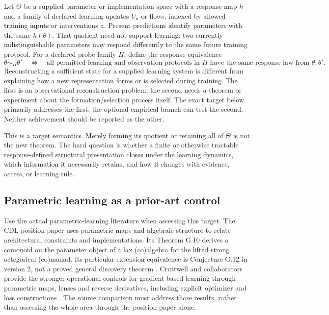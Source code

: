 \documentclass[11pt]{article}
\theoremstyle{remark}
\begin{document}
Let $\Theta$ be a supplied parameter or implementation space with a response map $h$ and a family of declared learning updates $U_a$ or flows, indexed by allowed training inputs or interventions $a$. Present predictions identify parameters with the same $h(\theta)$. That quotient need not support learning: two currently indistinguishable parameters may respond differently to the same future training protocol. For a declared probe family $\Pi$, define the response equivalence
\[
 \theta\sim_\Pi\theta'
 \quad\Longleftrightarrow\quad
 \text{all permitted learning-and-observation protocols in }\Pi
 \text{ have the same response law from }\theta,\theta'.
\]
Reconstructing a sufficient state for a supplied learning system is different from explaining how a new representation forms or is selected during training. The first is an observational reconstruction problem; the second needs a theorem or experiment about the formation/selection process itself. The exact target below primarily addresses the first; the optional empirical branch can test the second. Neither achievement should be reported as the other.

This is a target semantics. Merely forming its quotient or retaining all of $\Theta$ is not the new theorem. The hard question is whether a finite or otherwise tractable response-defined structural presentation closes under the learning dynamics, which information it necessarily retains, and how it changes with evidence, access, or learning rule.

\subsection{Parametric learning as a prior-art control}
\label{sec:parametric-control}

Use the actual parametric-learning literature when assessing this target. The CDL position paper uses parametric maps and algebraic structure to relate architectural constraints and implementations. Its Theorem G.10 derives a comonoid on the parameter object of a lax (co)algebra for the lifted strong actegorical (co)monad. Its particular extension equivalence is Conjecture G.12 in version 2, not a proved general discovery theorem \cite{CDL}. Cruttwell and collaborators provide the stronger operational controls for gradient-based learning through parametric maps, lenses and reverse derivatives, including explicit optimizer and loss constructions \cite{GradientLearning,ParametricLenses}. The source comparison must address those results, rather than assessing the whole area through the position paper alone.
\end{document}
